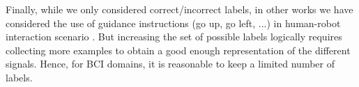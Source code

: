 Finally, while we only considered correct/incorrect labels, in other works we have considered the use of guidance instructions (go up, go left, ...) in human-robot interaction scenario \cite{grizou2013robot}. But increasing the set of possible labels logically requires collecting more examples to obtain a good enough representation of the different signals. Hence, for BCI domains, it is reasonable to keep a limited number of labels.



